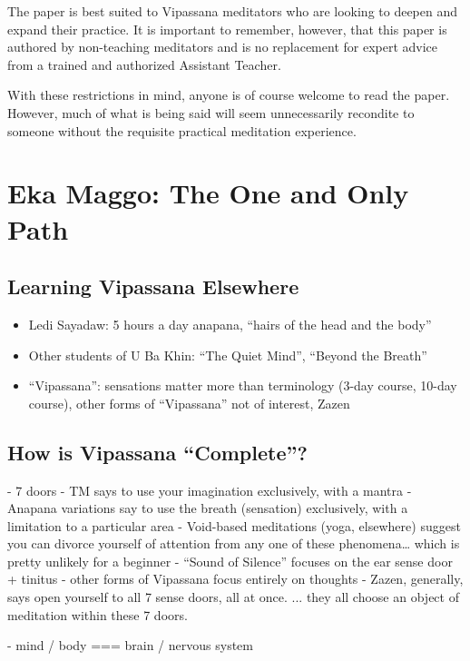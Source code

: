 \documentclass[a4paper, amsfonts, amssymb, amsmath, reprint, showkeys, nofootinbib, twoside]{revtex4-1}
\begin{document}
The paper is best suited to Vipassana meditators who are looking to deepen and expand
their practice. It is important to remember, however, that this paper is authored by
non-teaching meditators and is no replacement for expert advice from a trained and
authorized Assistant Teacher.

With these restrictions in mind, anyone is of course welcome to read the
paper. However, much of what is being said will seem unnecessarily recondite to
someone without the requisite practical meditation experience.


\section{Eka Maggo: The One and Only Path}

\subsection{Learning Vipassana Elsewhere}

\begin{itemize}
  \item Ledi Sayadaw: 5 hours a day anapana, ``hairs of the head and the body''
  \item Other students of U Ba Khin: ``The Quiet Mind'', ``Beyond the Breath''
  \item ``Vipassana'': sensations matter more than terminology (3-day course, 10-day course), other forms of ``Vipassana'' not of interest, Zazen
\end{itemize}

\subsection{How is Vipassana ``Complete''?}

- 7 doors
- TM says to use your imagination exclusively, with a mantra
- Anapana variations say to use the breath (sensation) exclusively, with a limitation to a particular area
- Void-based meditations (yoga, elsewhere) suggest you can divorce yourself of attention from any one of these phenomena… which is pretty unlikely for a beginner
- “Sound of Silence” focuses on the ear sense door + tinitus
- other forms of Vipassana focus entirely on thoughts
- Zazen, generally, says open yourself to all 7 sense doors, all at once.
... they all choose an object of meditation within these 7 doors.

- mind / body === brain / nervous system
\end{document}
